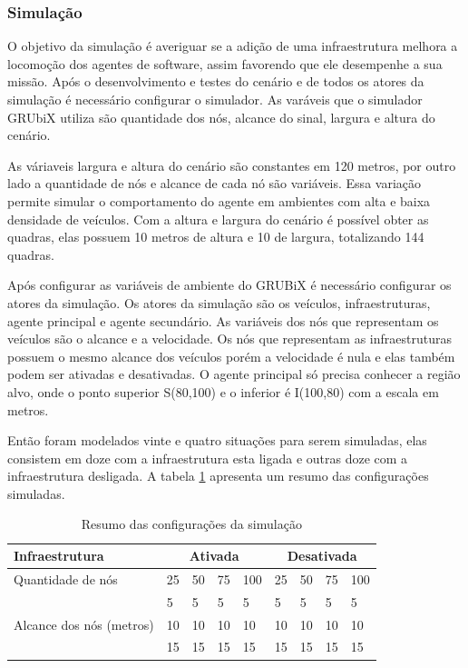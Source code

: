\subsubsection{Simulação}

O objetivo da simulação é averiguar se a adição de uma infraestrutura melhora a locomoção dos agentes de software, assim favorendo que ele desempenhe a sua missão. Após o desenvolvimento e testes do cenário e de todos os atores da simulação é necessário configurar o simulador. As varáveis que o simulador GRUbiX utiliza são quantidade dos nós, alcance do sinal, largura e altura do cenário. 

As váriaveis largura e altura do cenário são constantes em 120 metros, por outro lado a quantidade de nós e alcance de cada nó são variáveis. Essa variação permite simular o comportamento do agente em ambientes com alta e baixa densidade de veículos. Com a altura e largura do cenário é possível obter as quadras, elas possuem 10 metros de altura e 10 de largura, totalizando 144 quadras.

Após configurar as variáveis de ambiente do GRUBiX é necessário configurar os atores da simulação. Os atores da simulação são os veículos, infraestruturas, agente principal e agente secundário. As variáveis dos nós que representam os veículos são o alcance e a velocidade. Os nós que representam as infraestruturas possuem o mesmo alcance dos veículos porém a velocidade é nula e elas também podem ser ativadas e desativadas. O agente principal só precisa conhecer a região alvo, onde o ponto superior S(80,100) e o inferior é I(100,80) com a escala em metros.

Então foram modelados vinte e quatro situações para serem simuladas, elas consistem em doze com a infraestrutura esta ligada e outras doze com a infraestrutura desligada. A tabela \ref{tab:resumoConfiguracaoSimulacao} apresenta um resumo das configurações simuladas. 

\begin{table}[ht]
	\centering
	\begin{tabular}{| l | l | l | l | l | l | l | l | l |}
		\hline
		Infraestrutura &  \multicolumn{4}{|c|}{Ativada} & \multicolumn{4}{|c|}{Desativada} \\ \hline
		Quantidade de nós & 25 & 50 & 75 & 100 & 25 & 50 & 75 & 100 \\ \hline
		\multirow{3}{*}{Alcance dos nós (metros)} & 5 & 5 & 5 & 5 & 5 & 5 & 5 & 5 \\
												  & 10 & 10 & 10 & 10 & 10 & 10 & 10 & 10 \\
												  & 15 & 15 & 15 & 15 & 15 & 15 & 15 & 15 \\
		\hline	
	\end{tabular}
	\caption{Resumo das configurações da simulação}
	\label{tab:resumoConfiguracaoSimulacao}
\end{table}

